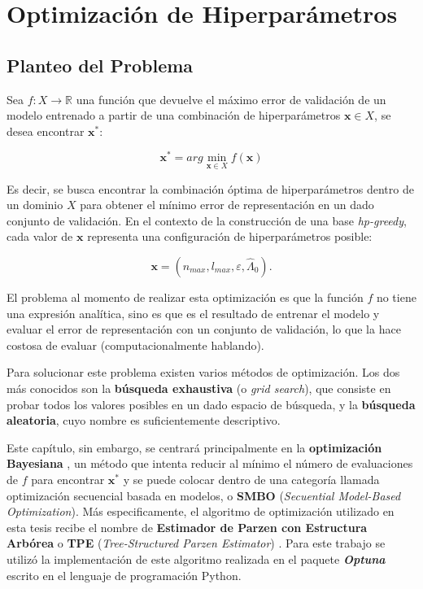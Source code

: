 \chapter{Optimización de Hiperparámetros}



\section{Planteo del Problema}

Sea $f: X \rightarrow \mathbb{R}$ una función que devuelve el máximo error de validación de un modelo entrenado a partir de una combinación de hiperparámetros $\textbf{x} \in X$, se desea encontrar $\textbf{x}^*$:

\[
\textbf{x}^* = arg \min_{\textbf{x} \in X} f(\textbf{x})
\]

Es decir, se busca encontrar la combinación óptima de hiperparámetros dentro de un dominio $X$ para obtener el mínimo error de representación en un dado conjunto de validación. En el contexto de la construcción de una base \textit{hp-greedy}, cada valor de $\textbf{x}$ representa una configuración de hiperparámetros posible: 

\[
\textbf{x} = (n_{max}, l_{max}, \varepsilon, \hat{\Lambda}_0).
\]


El problema al momento de realizar esta optimización es que la función $f$ no tiene una expresión analítica, sino es que es el resultado de entrenar el modelo y evaluar el error de representación con un conjunto de validación, lo que la hace costosa de evaluar (computacionalmente hablando).

Para solucionar este problema existen varios métodos de optimización. Los dos más conocidos son la \textbf{búsqueda exhaustiva} (o \textit{grid search}), que consiste en probar todos los valores posibles en un dado espacio de búsqueda, y la \textbf{búsqueda aleatoria}, cuyo nombre es suficientemente descriptivo.

Este capítulo, sin embargo, se centrará principalmente en la \textbf{optimización Bayesiana} \cite{7352306, https://doi.org/10.48550/arxiv.1012.2599}, un método que intenta reducir al mínimo el número de evaluaciones de $f$ para encontrar $\textbf{x}^*$ y se puede colocar dentro de una categoría llamada optimización secuencial basada en modelos, o \textbf{SMBO}\cite{dewancker2015bayesian,NIPS2011_86e8f7ab} (\textit{Secuential Model-Based Optimization}). Más especificamente, el algoritmo de optimización utilizado en esta tesis recibe el nombre de \textbf{Estimador de Parzen con Estructura Arbórea} o \textbf{TPE} (\textit{Tree-Structured Parzen Estimator}) \cite{NIPS2011_86e8f7ab}. Para este trabajo se utilizó la implementación de este algoritmo realizada en el paquete \textbf{\textit{Optuna}} \cite{optuna_2019} escrito en el lenguaje de programación Python.


